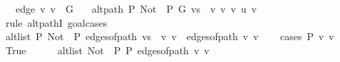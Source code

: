 \begin{isabellebody}
\ \ \ edge{\isacharcolon}{\kern0pt}\ {\isachardoublequoteopen}{\isacharbraceleft}{\kern0pt}v{\isacharprime}{\kern0pt}{\isacharcomma}{\kern0pt}\ v{\isacharbraceright}{\kern0pt}\ {\isasymin}\ G{\isachardoublequoteclose}\isanewline
\ \ \ {\isachardoublequoteopen}alt{\isacharunderscore}{\kern0pt}path\ P\ {\isacharparenleft}{\kern0pt}Not\ {\isasymcirc}\ P{\isacharparenright}{\kern0pt}\ G\ {\isacharparenleft}{\kern0pt}vs\ {\isacharat}{\kern0pt}\ {\isacharbrackleft}{\kern0pt}v{\isacharprime}{\kern0pt}{\isacharprime}{\kern0pt}{\isacharcomma}{\kern0pt}\ v{\isacharprime}{\kern0pt}{\isacharcomma}{\kern0pt}\ v{\isacharbrackright}{\kern0pt}{\isacharparenright}{\kern0pt}\ u\ v{\isachardoublequoteclose}\isanewline
%
\isadelimproof
%
\endisadelimproof
%
\isatagproof
{}\isamarkupfalse%
\ {\isacharparenleft}{\kern0pt}rule\ alt{\isacharunderscore}{\kern0pt}pathI{\isacharcomma}{\kern0pt}\ goal{\isacharunderscore}{\kern0pt}cases{\isacharparenright}{\kern0pt}\isanewline
\ \ \isamarkupfalse%
\ {}\isanewline
\ \ \isamarkupfalse%
\ {\isachardoublequoteopen}alt{\isacharunderscore}{\kern0pt}list\ P\ {\isacharparenleft}{\kern0pt}Not\ {\isasymcirc}\ P{\isacharparenright}{\kern0pt}\ {\isacharparenleft}{\kern0pt}edges{\isacharunderscore}{\kern0pt}of{\isacharunderscore}{\kern0pt}path\ {\isacharparenleft}{\kern0pt}vs\ {\isacharat}{\kern0pt}\ {\isacharbrackleft}{\kern0pt}v{\isacharprime}{\kern0pt}{\isacharprime}{\kern0pt}{\isacharcomma}{\kern0pt}\ v{\isacharprime}{\kern0pt}{\isacharbrackright}{\kern0pt}{\isacharparenright}{\kern0pt}\ {\isacharat}{\kern0pt}\ edges{\isacharunderscore}{\kern0pt}of{\isacharunderscore}{\kern0pt}path\ {\isacharbrackleft}{\kern0pt}v{\isacharprime}{\kern0pt}{\isacharcomma}{\kern0pt}\ v{\isacharbrackright}{\kern0pt}{\isacharparenright}{\kern0pt}{\isachardoublequoteclose}\isanewline
\ \ \isamarkupfalse%
\ {\isacharparenleft}{\kern0pt}cases\ {\isachardoublequoteopen}P\ {\isacharbraceleft}{\kern0pt}v{\isacharprime}{\kern0pt}{\isacharprime}{\kern0pt}{\isacharcomma}{\kern0pt}\ v{\isacharprime}{\kern0pt}{\isacharbraceright}{\kern0pt}{\isachardoublequoteclose}{\isacharparenright}{\kern0pt}\isanewline
\ \ \ \ \isamarkupfalse%
\ True\isanewline
\ \ \ \ \isamarkupfalse%
\ {\isachardoublequoteopen}alt{\isacharunderscore}{\kern0pt}list\ {\isacharparenleft}{\kern0pt}Not\ {\isasymcirc}\ P{\isacharparenright}{\kern0pt}\ P\ {\isacharparenleft}{\kern0pt}edges{\isacharunderscore}{\kern0pt}of{\isacharunderscore}{\kern0pt}path\ {\isacharbrackleft}{\kern0pt}v{\isacharprime}{\kern0pt}{\isacharcomma}{\kern0pt}\ v{\isacharbrackright}{\kern0pt}{\isacharparenright}{\kern0pt}{\isachardoublequoteclose}\isanewline

\end{isabellebody}
